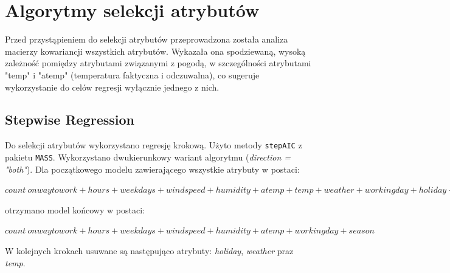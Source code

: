 \documentclass[a4paper,12pt]{article}
\begin{document}
\section{Algorytmy selekcji atrybutów}

    Przed przystąpieniem do selekcji atrybutów przeprowadzona została analiza macierzy kowariancji wszystkich atrybutów. Wykazała ona
    spodziewaną, wysoką zależność pomiędzy atrybutami związanymi z pogodą, w szczególności atrybutami "temp" i "atemp" (temperatura faktyczna i odczuwalna),
    co sugeruje wykorzystanie do celów regresji wyłącznie jednego z nich.
    
    \subsection{Stepwise Regression}
    
        Do selekcji atrybutów wykorzystano regresję krokową. Użyto metody \texttt{stepAIC} z pakietu \texttt{MASS}. Wykorzystano dwukierunkowy wariant algorytmu (\textit{direction = "both"}).
        Dla początkowego modelu zawierającego wszystkie atrybuty w postaci:
        
        $count ~ onwaytowork + hours + weekdays + windspeed + humidity + atemp + temp + weather + workingday + holiday + season$
        
        otrzymano model końcowy w postaci:
        
        $count ~ onwaytowork + hours + weekdays + windspeed + humidity + atemp + workingday + season$
        
        W kolejnych krokach usuwane są następująco atrybuty: \textit{holiday}, \textit{weather} praz \textit{temp}.
       
\end{document}
